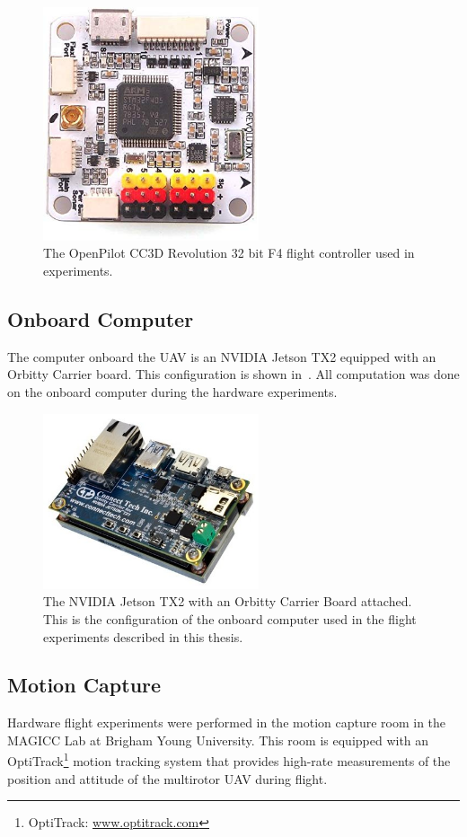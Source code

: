 \begin{figure}[htbp]
  \centering
  \includegraphics[width=2.5in]{figures/f4.jpg}
  \caption[OpenPilot CC3D Revolution 32 bit F4]{ The OpenPilot CC3D Revolution 32
  bit F4 flight controller used in experiments.}
%
  \label{fig:f4}
\end{figure}

\subsection{Onboard Computer}
The computer onboard the UAV is an NVIDIA Jetson TX2 equipped with an Orbitty
Carrier board. This configuration is shown in~. All
computation was done on the onboard computer during the hardware experiments.

\begin{figure}[h]
  \centering
  \includegraphics[width=2.5in]{figures/tx2_orbitty.jpg}
  \caption[NVIDIA Jetson TX2 with Orbitty Carrier Board]{The NVIDIA Jetson TX2
  with an Orbitty Carrier Board attached. This is the configuration of the
onboard computer used in the flight experiments described in this thesis.}
%
  \label{fig:tx2_orbitty}
\end{figure}

\subsection{Motion Capture}
Hardware flight experiments were performed in the motion capture room in the
MAGICC Lab at Brigham Young University. This room is equipped with an OptiTrack\footnote{OptiTrack:
\href{www.optitrack.com}{www.optitrack.com}} motion tracking system that
provides high-rate measurements of the position and attitude of the multirotor
UAV during flight.

